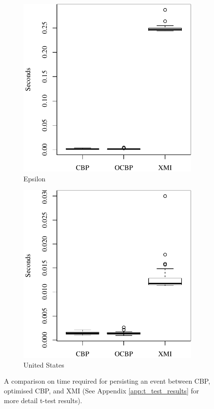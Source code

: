 \documentclass{llncs}
\begin{document}
\begin{figure}[ht]
\begin{subfigure}{0.325\textwidth}
            \includegraphics[width=\linewidth]{images/save_time_epsilon}
            \caption{Epsilon}
            \label{fig:save_time_epsilon}
        \end{subfigure}
        \hfill
        \begin{subfigure}{0.325\textwidth}
            \centering
            \includegraphics[width=\linewidth]{images/save_time_wikipedia}
            \caption{United States}
            \label{fig:save_time_wikipedia}
        \end{subfigure}
        \caption{A comparison on time required for persisting an event between CBP, optimised CBP, and XMI (See Appendix \ref{app:t_test_results} for more detail t-test results).}
        \label{fig:savetime}
    \end{figure}
    
\end{document}

